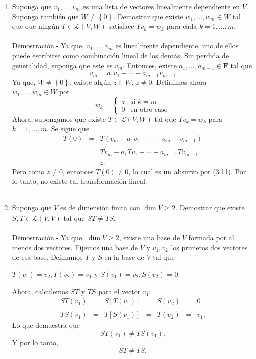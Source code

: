 \begin{enumerate}[\bfseries 1.]
    \item Suponga que $v_1,\ldots,v_m$ es una lista de vectores linealmente dependiente en $V$. Suponga también que $W\neq \left\{0\right\}$. Demostrar que existe $w_1,\ldots,w_m\in W$ tal que que ningún $T\in \mathcal{L}(V,W)$ satisface $Tv_k=w_k$ para cada $k=1,\ldots,m$.\\\\
	Demostración.-\; Ya que, $v_1,\ldots,v_m$ es linealmente dependiente, uno de ellos puede escribirse como combinación lineal de los demás. Sin perdida de generalidad, suponga que este es $v_m$. Entonces, existe $a_1,\ldots,a_{m-1}\in \textbf{F}$ tal que 
	$$v_m=a_1v_1 + \cdots + a_{m-1}v_{m-1}$$
    Ya que, $W\neq \left\{0\right\}$, existe algún $z\in W$, $z\neq 0$. Definimos ahora $w_1,\ldots,w_m\in W$ por
	$$
	w_k=\left\{
	    \begin{array}{cl}
		z & \text{si } k=m\\
		0 & \text{en otro caso}
	    \end{array}
	\right.
	$$
	Ahora, supongamos que existe $T\in \mathcal{L}(V,W)$ tal que $Tv_k = w_k$ para $k=1,\ldots,m$. Se sigue que
	$$
	\begin{array}{rcl}
	    T(0) &=& T\left(v_m-a_1v_1-\cdots - a_{m-1}v_{m-1}\right)\\\\	
		 &=& Tv_m -a_1Tv_1-\cdots-a_{m-1}Tv_{m-1}\\\\
		 &=& z.
	\end{array}
	$$
	Pero como $z\neq 0$, entonces $T(0)\neq 0$, lo cual es un absurvo por (3.11). Por lo tanto, no existe tal transformación lineal.\\\\

    \item Suponga que $V$ es de dimensión finita con $\dim V\geq 2$. Demostrar que existe $S,T\in \mathcal{L}(V,V)$ tal que $ST\neq TS$.\\\\
	Demostración.-\; Ya que, $\dim V \geq 2$, existe una base de $V$ formada por al menos dos vectores. Fijemos una base de $V$ y $v_1,v_2$ los primeros dos vectores de esa base. Definamos $T$ y $S$ en la base de $V$ tal que 
	\begin{center}
	    $T(v_1)=v_2,T(v_2)=v_1$ y $S(v_1)=v_2,S(v_2)=0$. 
	\end{center}
	Ahora, calculemos $ST$ y $TS$ para el vector $v_1$:
	$$
	\begin{array}{ccccccc}
	    ST(v_1) &=& S\left[T(v_1)\right] &=& S(v_2) &=& 0\\\\	
	    TS(v_1) &=& T\left[S(v_1)\right] &=& T(v_2) &=& v_1.
	\end{array}
	$$
	Lo que demuestra que 
	$$ST(v_1)\neq TS(v_1).$$
	Y por lo tanto,
	$$ST\neq TS.$$\\

\end{enumerate}



